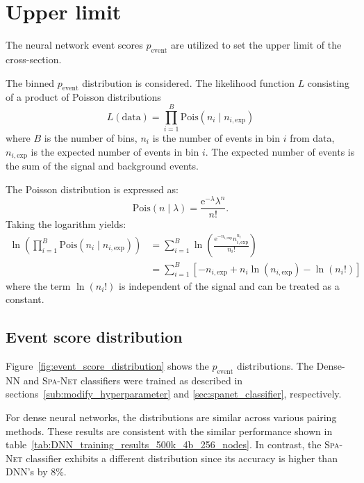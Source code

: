 \documentclass[12pt]{article}
\newcommand*{\euler}{\mathrm{e}}
\begin{document}
\section{Upper limit}%
\label{sec:upper_limit}
    The neural network event scores $p_{\text{event}}$ are utilized to set the upper limit of the cross-section.

    The binned $p_{\text{event}}$ distribution is considered. The likelihood function $L$ consisting of a product of Poisson distributions
    \begin{equation}
        L(\text{data}) = \prod_{i=1}^{B} \text{Pois}(n_i\mid n_{i,\text{exp}})
    \end{equation}
    where $B$ is the number of bins, $n_i$ is the number of events in bin $i$ from data, $n_{i,\text{exp}}$ is the expected number of events in bin $i$. The expected number of events is the sum of the signal and background events.

    The Poisson distribution is expressed as:
    \begin{equation}
        \text{Pois}(n\mid \lambda) = \frac{\euler^{-\lambda} \lambda^{n}}{n!}.
    \end{equation}
    Taking the logarithm yields:
    \begin{equation}
        \begin{aligned}
            \ln \left( \prod_{i=1}^{B} \text{Pois}(n_i\mid n_{i,\text{exp}}) \right) &=  \sum_{i=1}^{B} \ln \left( \frac{\euler^{-n_{i,\text{exp}}} n_{i,\text{exp}}^{n_i}}{n_i!} \right) \\
            &=  \sum_{i=1}^{B} \left[ - n_{i,\text{exp}} + n_i \ln (n_{i,\text{exp}} ) - \ln (n_i!)\right]
        \end{aligned}
    \end{equation}
    where the term $\ln(n_i!)$ is independent of the signal and can be treated as a constant.
    \subsection{Event score distribution}%
    \label{sub:event_score_distribution}
        Figure~\ref{fig:event_score_distribution} shows the $p_{\text{event}}$ distributions. The Dense-NN and \textsc{Spa-Net} classifiers were trained as described in sections~\ref{sub:modify_hyperparameter} and \ref{sec:spanet_classifier}, respectively.

    For dense neural networks, the distributions are similar across various pairing methods. These results are consistent with the similar performance shown in table~\ref{tab:DNN_training_results_500k_4b_256_nodes}. In contrast, the \textsc{Spa-Net} classifier exhibits a different distribution since its accuracy is higher than DNN's by 8\%.
\end{document}
